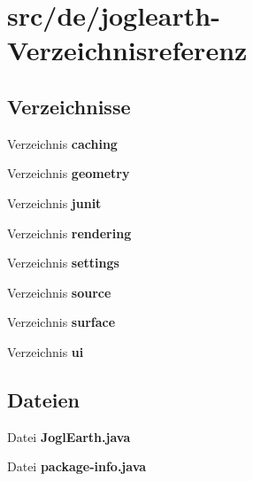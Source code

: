\section{src/de/joglearth-\/\-Verzeichnisreferenz}
\label{dir_fb845e964c02d43339a7d02b68a3ba21}
\subsection*{Verzeichnisse}
\begin{DoxyCompactItemize}
\item 
Verzeichnis {\bf caching}
\item 
Verzeichnis {\bf geometry}
\item 
Verzeichnis {\bf junit}
\item 
Verzeichnis {\bf rendering}
\item 
Verzeichnis {\bf settings}
\item 
Verzeichnis {\bf source}
\item 
Verzeichnis {\bf surface}
\item 
Verzeichnis {\bf ui}
\end{DoxyCompactItemize}
\subsection*{Dateien}
\begin{DoxyCompactItemize}
\item 
Datei {\bfseries Jogl\-Earth.\-java}
\item 
Datei {\bfseries package-\/info.\-java}
\end{DoxyCompactItemize}
